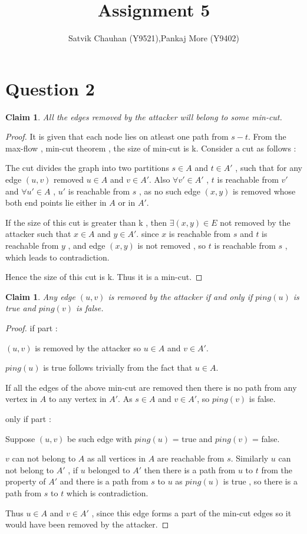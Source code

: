 \documentclass[11pt]{article}
\title{Assignment 5}
\author{Satvik Chauhan (Y9521),Pankaj More (Y9402)}
\newtheorem{claim}[theorem]{Claim}
\begin{document}
\maketitle
\section*{Question 2}
\begin{claim}
All the edges removed by the attacker will belong to some min-cut.
\label{mincut}
\end{claim}
\begin{proof}
It is given that each node lies on atleast one path from $s-t$.
From the max-flow , min-cut theorem , the size of min-cut is k. Consider a cut as follows :

The cut divides the graph into two partitions $s \in A$ and $t \in A'$ , such that for any edge $(u,v)$ removed $u \in A$ and $v \in A'$. Also $\forall v' \in A'$ , $t$ is reachable from $v'$ and $\forall u' \in A $ , $u'$ is reachable from $s$ , as no such edge $(x,y)$ is removed whose both end points lie either in $A$ or in $A'$.

If the size of this cut is greater than k , then $\exists (x,y) \in E$ not removed by the attacker such that $x \in A$ and $y \in A'$.
since $x$ is reachable from $s$ and $t$ is reachable from $y$ , and edge $(x,y)$ is not removed , so $t$ is reachable from $s$ , which leads to contradiction. 

Hence the size of this cut is k. Thus it is a min-cut.
\end{proof}

\begin{claim}
Any edge $(u,v)$ is removed by the attacker if and only if $ping(u)$ is true and $ping(v)$ is false. 
\label{ping}
\end{claim}
\begin{proof}
if part :

$(u,v)$ is removed by the attacker so $u \in A$ and $v \in A'$.

$ping(u)$ is true follows trivially from the fact that $u \in A$.

If all the edges of the above min-cut are removed then there is no path from any vertex in $A$ to any vertex in $A'$. 
As $s \in A$ and $v \in A'$, so $ping(v)$ is false.

only if part :

Suppose $(u,v)$ be such edge with $ping(u)$ = true and $ping(v)$ = false.

$v$ can not belong to $A$ as all vertices in $A$ are reachable from $s$. Similarly $u$ can not belong to $A'$ , if $u$ belonged to $A'$ then there is a path from $u$ to $t$ from the property of $A'$ and there is a path from $s$ to $u$ as $ping(u)$ is true , so there is a path from $s$ to $t$ which is contradiction. 

Thus $u \in A$ and $v \in A'$ , since this edge forms a part of the min-cut edges so it would have been removed by the attacker.

\end{proof}
\end{document}
